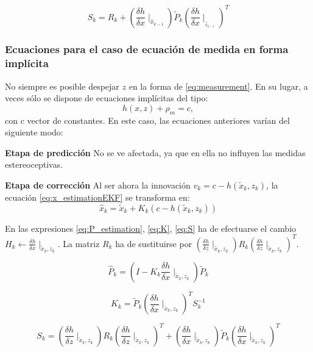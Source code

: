 \begin{equation}\label{eq:SEKF}
    S_{k} = R_{k}+(\frac{\delta h}{\delta x}\mid _{\hat{x}_{k-1}})\tilde{P}_{k} (\frac{\delta h}{\delta x}\mid _{_{\hat{x}_{k-1}}})^{T}
\end{equation}

\subsubsection{Ecuaciones para el caso de ecuación de medida en forma implícita}

No siempre es posible despejar $z$ en la forma de \ref{eq:measurement}. En su lugar, a veces sólo se dispone de ecuaciones implícitas del tipo:
\begin{equation}\label{eq:implicit}
    h(x,z)+\rho_{m}=c,
\end{equation}
con c vector de constantes.
En este caso, las ecuaciones anteriores varían del siguiente modo:


\textbf{Etapa de predicción}
No se ve afectada, ya que en ella no influyen las medidas estereoceptivas.


\textbf{Etapa de corrección}
Al ser ahora la innovación $v_{k}=c-h(\tilde{x}_{k},z_{k})$, la ecuación \ref{eq:x_estimationEKF} se transforma en:
\begin{equation}\label{eq:x_estimationIm}
    \hat{x}_{k} = \tilde{x}_{k}+K_{k}(c-h(\tilde{x}_{k},z_{k}))
\end{equation}

En las expresiones \ref{eq:P_estimation}, \ref{eq:K}, \ref{eq:S} ha de efectuarse el cambio $H_{k}\leftarrow \frac{\delta h}{\delta x}\mid_{\tilde{x}_{k},z_{k}}$. La matriz $R_{k}$ ha de sustituirse por $(\frac{\delta h}{\delta z} \mid _{\tilde{x}_{k},z_{k}}) R_{k} (\frac{\delta h}{\delta z} \mid _{\tilde{x}_{k},z_{k}})^{T}$.

 \begin{equation}\label{eq:P_estimationEKF_im}
    \hat{P}_{k} = (I-K_{k}\frac{\delta h}{\delta x}\mid_{\tilde{x}_{k},z_{k}})\tilde{P}_{k}
\end{equation}

\begin{equation}\label{eq:KEKF_im}
    K_{k} = \tilde{P}_{k}(\frac{\delta h}{\delta x}\mid_{\tilde{x}_{k},z_{k}})^{T}S_{k}^{-1}
\end{equation}

\begin{equation}\label{eq:SEKF_im}
    S_{k} = (\frac{\delta h}{\delta z} \mid _{\tilde{x}_{k},z_{k}}) R_{k} (\frac{\delta h}{\delta z} \mid _{\tilde{x}_{k},z_{k}})^{T}+(\frac{\delta h}{\delta x}\mid_{\tilde{x}_{k},z_{k}})\tilde{P}_{k} (\frac{\delta h}{\delta x}\mid_{\tilde{x}_{k},z_{k}})^{T}
\end{equation}


